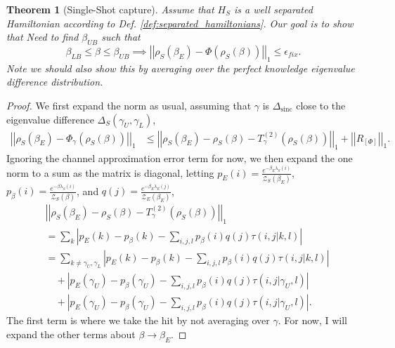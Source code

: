 \documentclass{article}
\newtheorem{theorem}{Theorem}
\newcommand{\abs}[1]{\left| #1 \right|}
\newcommand{\norm}[1]{\left| \left| #1 \right| \right|}
\newcommand{\partfun}{\mathcal{Z}}
\DeclareMathOperator{\sinc}{sinc}
\begin{document}
\begin{theorem}[Single-Shot capture]
    Assume that $H_S$ is a well separated Hamiltonian according to Def. \ref{def:separated_hamiltonians}. Our goal is to show that 
    Need to find $\beta_{UB}$ such that 
    \begin{equation}
        \beta_{LB} \leq \beta \leq \beta_{UB} \implies \norm{\rho_S(\beta_E) - \Phi(\rho_S(\beta))}_1 \leq \epsilon_{fix}.
    \end{equation}
    Note we should also show this by averaging over the perfect knowledge eigenvalue difference distribution.
\end{theorem}
\begin{proof}
    We first expand the norm as usual, assuming that $\gamma$ is $\Delta_{\sinc}$ close to the eigenvalue difference $\Delta_S(\gamma_U, \gamma_L)$,
    \begin{align}
        \norm{\rho_S(\beta_E) - \Phi_\gamma(\rho_S(\beta))}_1 &\leq \norm{\rho_S(\beta_E) - \rho_S(\beta) - T^{(2)}_{\gamma}(\rho_S(\beta))}_1 + \norm{R_[\Phi]}_1.
    \end{align}
    Ignoring the channel approximation error term for now, we then expand the one norm to a sum as the matrix is diagonal, letting $p_E(i) = \frac{e^{-\beta_E \lambda_S(i)}}{\partfun_S(\beta_E)}$, $p_{\beta}(i) = \frac{e^{-\beta \lambda_S(i)}}{\partfun_S(\beta)}$, and $q(j) = \frac{e^{-\beta_E \lambda_E(j)}}{\partfun_E(\beta_E)}$,
    \begin{align}
        &\norm{\rho_S(\beta_E) - \rho_S(\beta) - T^{(2)}_{\gamma}(\rho_S(\beta))}_1 \nonumber \\
        &= \sum_k \abs{p_E(k) - p_{\beta}(k) - \sum_{i,j,l} p_{\beta}(i) q(j) \tau(i,j | k, l) } \\
        &= \sum_{k \neq \gamma_U, \gamma_L} \abs{p_E(k) - p_{\beta}(k) - \sum_{i,j,l} p_{\beta}(i) q(j) \tau(i,j | k, l) } \nonumber \\
        &\quad + \abs{p_E(\gamma_U) - p_{\beta}(\gamma_U) - \sum_{i,j,l} p_{\beta}(i) q(j) \tau(i,j| \gamma_U, l) } \nonumber \\
        &\quad +\abs{p_E(\gamma_U) - p_{\beta}(\gamma_U) - \sum_{i,j,l} p_{\beta}(i) q(j) \tau(i,j| \gamma_U, l) }.
    \end{align}
    The first term is where we take the hit by not averaging over $\gamma$. For now, I will expand the other terms about $\beta \to \beta_E$.


\end{proof}
\end{document}
